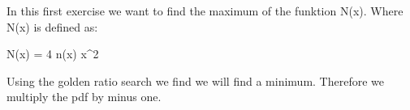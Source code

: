 In this first exercise we want to find the maximum of the funktion N(x). Where N(x) is defined as:
\begin{algign}
    N(x) = 4 \pi n(x) x^2
\end{algign} 
Using the golden ratio search we find we will find a minimum. Therefore we multiply the pdf by minus one. 


